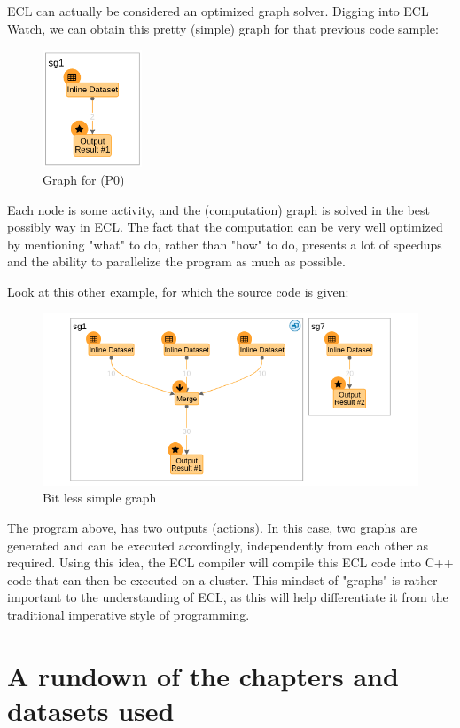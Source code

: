 ECL can actually be considered an optimized graph solver. Digging into ECL Watch, we can obtain this pretty (simple) graph for that previous code sample:
\begin{figure}[h]
    \centering
    \includegraphics[height=3.5cm]{../media/simplegraph}
    \caption{Graph for (P0)}
\end{figure}

Each node is some activity, and the (computation) graph is solved in the best possibly way in ECL. The fact that the computation can be very well optimized by mentioning "what" to do, rather than "how" to do, presents a lot of speedups and the ability to parallelize the program as much as possible.

Look at this other example, for which the source code is given:



\begin{figure}[h]
    \centering
    \includegraphics[width=.6\linewidth]{../media/bitlesssimplegraph.png}
    \caption{Bit less simple graph}
\end{figure}

The program above, has two outputs (actions). In this case, two graphs are generated and can be executed accordingly, independently from each other as required. Using this idea, the ECL compiler will compile this ECL code into C++ code that can then be executed on a cluster. This mindset of "graphs" is rather important to the understanding of ECL, as this will help differentiate it from the traditional imperative style of programming.

\section[Chapter information and Datasets]{A rundown of the chapters and datasets used}

